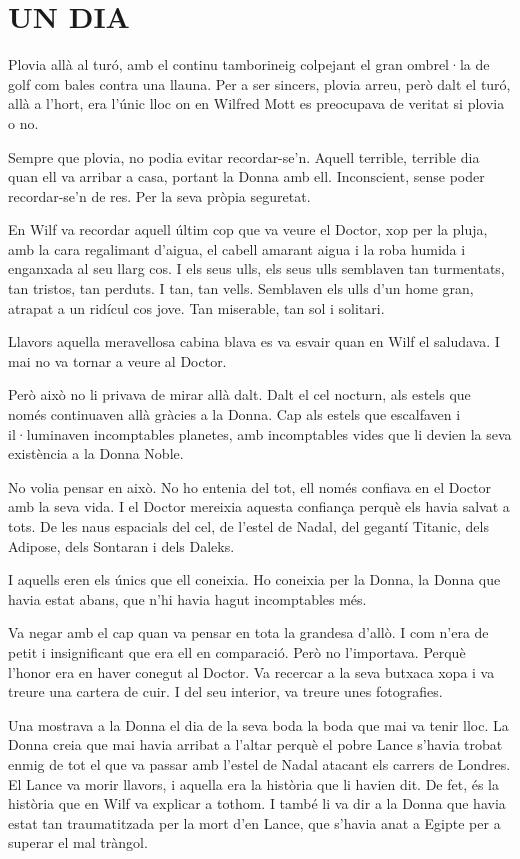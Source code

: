 \chapter*{UN DIA}

Plovia allà al turó, amb el continu tamborineig colpejant el gran
ombrel·la de golf com bales contra una llauna. Per a ser sincers, plovia
arreu, però dalt el turó, allà a l'hort, era l'únic lloc on en Wilfred
Mott es preocupava de veritat si plovia o no.

Sempre que plovia, no podia evitar recordar-se'n. Aquell terrible,
terrible dia quan ell va arribar a casa, portant la Donna amb ell.
Inconscient, sense poder recordar-se'n de res. Per la seva pròpia
seguretat.

En Wilf va recordar aquell últim cop que va veure el Doctor, xop per la
pluja, amb la cara regalimant d'aigua, el cabell amarant aigua i la roba
humida i enganxada al seu llarg cos. I els seus ulls, els seus ulls
semblaven tan turmentats, tan tristos, tan perduts. I tan, tan vells.
Semblaven els ulls d'un home gran, atrapat a un ridícul cos jove. Tan
miserable, tan sol i solitari.

Llavors aquella meravellosa cabina blava es va esvair quan en Wilf el
saludava. I mai no va tornar a veure al Doctor.

Però això no li privava de mirar allà dalt. Dalt el cel nocturn, als
estels que només continuaven allà gràcies a la Donna. Cap als estels que
escalfaven i il·luminaven incomptables planetes, amb incomptables vides
que li devien la seva existència a la Donna Noble.

No volia pensar en això. No ho entenia del tot, ell només confiava en el
Doctor amb la seva vida. I el Doctor mereixia aquesta confiança perquè
els havia salvat a tots. De les naus espacials del cel, de l'estel de
Nadal, del gegantí Titanic, dels Adipose, dels Sontaran i dels Daleks.

I aquells eren els únics que ell coneixia. Ho coneixia per la Donna, la
Donna que havia estat abans, que n'hi havia hagut incomptables més.

Va negar amb el cap quan va pensar en tota la grandesa d'allò. I com
n'era de petit i insignificant que era ell en comparació. Però no
l'importava. Perquè l'honor era en haver conegut al Doctor. Va recercar
a la seva butxaca xopa i va treure una cartera de cuir. I del seu
interior, va treure unes fotografies.

Una mostrava a la Donna el dia de la seva boda la boda que mai va tenir
lloc. La Donna creia que mai havia arribat a l'altar perquè el pobre
Lance s'havia trobat enmig de tot el que va passar amb l'estel de Nadal
atacant els carrers de Londres. El Lance va morir llavors, i aquella era
la història que li havien dit. De fet, és la història que en Wilf va
explicar a tothom. I també li va dir a la Donna que havia estat tan
traumatitzada per la mort d'en Lance, que s'havia anat a Egipte per a
superar el mal tràngol.

